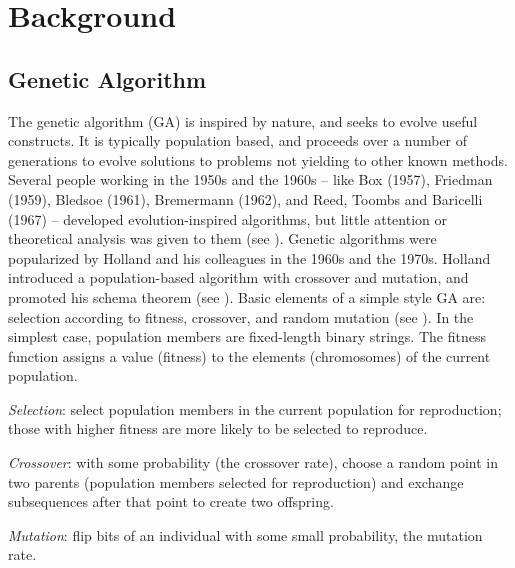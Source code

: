 \section{Background}
\subsection{Genetic Algorithm}
The genetic algorithm (GA) is inspired by nature, and seeks to evolve useful constructs. 
It is typically population based, and 
proceeds over a number of generations to evolve solutions to problems not yielding to other known methods. 
Several people working in the 1950s and the 1960s -- like Box (1957), Friedman (1959),
Bledsoe (1961), Bremermann (1962), and Reed, Toombs and Baricelli (1967) -- developed evolution-inspired algorithms, 
but little attention or theoretical analysis was given to them (see \cite{Mitchell1999}). Genetic algorithms were popularized by Holland 
and his colleagues in the 1960s and the 1970s. Holland introduced a population-based algorithm with crossover and mutation, 
and promoted his schema theorem (see \cite{Holland1975}). 
Basic elements of a simple style GA are: 
selection according to fitness, crossover, and random mutation (see \cite{Mitchell1999}). 
In the simplest case, population members are fixed-length binary strings.   
The fitness function assigns a value (fitness) to the elements (chromosomes) of 
the current population. 

\textit{Selection}: select population members in the current population for reproduction; 
those with higher fitness are more likely to be selected to reproduce.

\textit{Crossover}: with some probability (the crossover rate), choose a random point in two parents (population members selected for reproduction) 
and exchange subsequences after that point to create two offspring.

\textit{Mutation}: flip bits of an individual with some small probability, 
the mutation rate.

